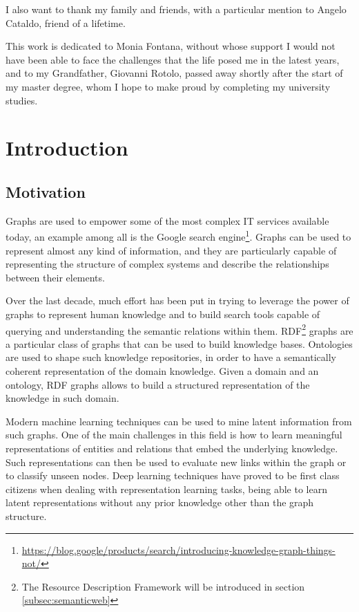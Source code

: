 \documentclass[%
    corpo=13.5pt,
    twoside,
    oldstyle,
    tipotesi=magistrale,
    greek,
    evenboxes
]{toptesi}
\begin{document}
I also want to thank my family and friends, with a particular mention to
Angelo Cataldo, friend of a lifetime.

This work is dedicated to Monia Fontana, without whose support I would not
have been able to face the challenges that the life posed me in the latest
years, and to my Grandfather, Giovanni Rotolo, passed away shortly after
the start of my master degree, whom I hope to make proud by completing my
university studies.

\tablespagetrue\figurespagetrue
\indici

\mainmatter

\chapter{Introduction}

\section{Motivation}

Graphs are used to empower some of the most complex IT services available
today, an example among all is the Google search engine\footnote{\url{https://blog.google/products/search/introducing-knowledge-graph-things-not/}}.
Graphs can be used to represent almost any kind of information, and they are
particularly capable of representing the structure of complex systems and
describe the relationships between their elements.

Over the last decade, much effort has been put in trying to leverage the power
of graphs to represent human knowledge and to build search tools capable of
querying and understanding the semantic relations within them.
RDF\footnote{The Resource Description Framework will be introduced in
section \ref{subsec:semanticweb}} graphs are a
particular class of graphs that can be used to build knowledge
bases. Ontologies are used to shape such knowledge repositories, in order to
have a semantically coherent representation of the domain knowledge.
Given a domain and an ontology, RDF graphs allows to build a structured
representation of the knowledge in such domain.

Modern machine learning techniques can be used to mine latent information
from such graphs. One of the main challenges in this field is how to learn
meaningful representations of entities and relations that embed
the underlying knowledge. Such representations can then be used to evaluate
new links within the graph or to classify unseen nodes.
Deep learning techniques have proved to be first class citizens when
dealing with representation learning tasks, being able to learn latent
representations without any prior knowledge other than the graph structure.
\end{document}

